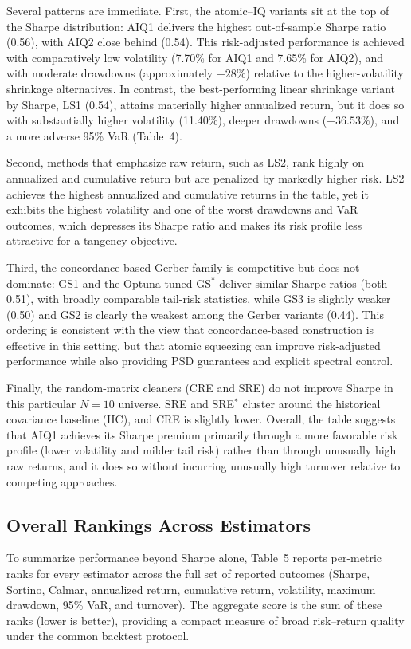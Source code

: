 \documentclass[12pt,letterpaper]{article}
\begin{document}
Several patterns are immediate. First, the atomic--IQ variants sit at the top of the Sharpe distribution: AIQ1 delivers the highest out-of-sample Sharpe ratio (0.56), with AIQ2 close behind (0.54). This risk-adjusted performance is achieved with comparatively low volatility (7.70\% for AIQ1 and 7.65\% for AIQ2), and with moderate drawdowns (approximately $-28\%$) relative to the higher-volatility shrinkage alternatives. In contrast, the best-performing linear shrinkage variant by Sharpe, LS1 (0.54), attains materially higher annualized return, but it does so with substantially higher volatility (11.40\%), deeper drawdowns ($-36.53\%$), and a more adverse 95\% VaR (Table~4).

Second, methods that emphasize raw return, such as LS2, rank highly on annualized and cumulative return but are penalized by markedly higher risk. LS2 achieves the highest annualized and cumulative returns in the table, yet it exhibits the highest volatility and one of the worst drawdowns and VaR outcomes, which depresses its Sharpe ratio and makes its risk profile less attractive for a tangency objective.

Third, the concordance-based Gerber family is competitive but does not dominate: GS1 and the Optuna-tuned GS$^{\ast}$ deliver similar Sharpe ratios (both 0.51), with broadly comparable tail-risk statistics, while GS3 is slightly weaker (0.50) and GS2 is clearly the weakest among the Gerber variants (0.44). This ordering is consistent with the view that concordance-based construction is effective in this setting, but that atomic squeezing can improve risk-adjusted performance while also providing PSD guarantees and explicit spectral control.

Finally, the random-matrix cleaners (CRE and SRE) do not improve Sharpe in this particular $N=10$ universe. SRE and SRE$^{\ast}$ cluster around the historical covariance baseline (HC), and CRE is slightly lower. Overall, the table suggests that AIQ1 achieves its Sharpe premium primarily through a more favorable risk profile (lower volatility and milder tail risk) rather than through unusually high raw returns, and it does so without incurring unusually high turnover relative to competing approaches.


\subsection{Overall Rankings Across Estimators}
\label{sec:results}

To summarize performance beyond Sharpe alone, Table~5 reports per-metric ranks for every estimator across the full set of reported outcomes (Sharpe, Sortino, Calmar, annualized return, cumulative return, volatility, maximum drawdown, 95\% VaR, and turnover). The aggregate score is the sum of these ranks (lower is better), providing a compact measure of broad risk--return quality under the common backtest protocol.
\end{document}
